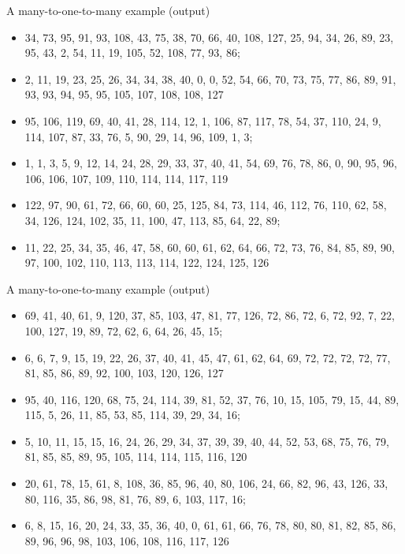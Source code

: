 \documentclass[10pt]{beamer}
\begin{document}
 \begin{frame}{A many-to-one-to-many example (output)}
 \begin{itemize}
   \item 34, 73, 95, 91, 93, 108, 43, 75, 38, 70, 66, 40, 108, 127, 25, 94, 34, 26, 89, 23, 95, 43, 2, 54, 11, 19, 105, 52, 108, 77, 93, 86;
   \item 2, 11, 19, 23, 25, 26, 34, 34, 38, 40, 0, 0, 52, 54, 66, 70, 73, 75, 77, 86, 89, 91, 93, 93, 94, 95, 95, 105, 107, 108, 108, 127
 \end{itemize}
 \begin{itemize}
   \item 95, 106, 119, 69, 40, 41, 28, 114, 12, 1, 106, 87, 117, 78, 54, 37, 110, 24, 9, 114, 107, 87, 33, 76, 5, 90, 29, 14, 96, 109, 1, 3;
   \item 1, 1, 3, 5, 9, 12, 14, 24, 28, 29, 33, 37, 40, 41, 54, 69, 76, 78, 86, 0, 90, 95, 96, 106, 106, 107, 109, 110, 114, 114, 117, 119
 \end{itemize}
 \begin{itemize}
   \item 122, 97, 90, 61, 72, 66, 60, 60, 25, 125, 84, 73, 114, 46, 112, 76, 110, 62, 58, 34, 126, 124, 102, 35, 11, 100, 47, 113, 85, 64, 22, 89;
   \item 11, 22, 25, 34, 35, 46, 47, 58, 60, 60, 61, 62, 64, 66, 72, 73, 76, 84, 85, 89, 90, 97, 100, 102, 110, 113, 113, 114, 122, 124, 125, 126
 \end{itemize}
 \end{frame}

 \begin{frame}{A many-to-one-to-many example (output)}
 \begin{itemize}
   \item 69, 41, 40, 61, 9, 120, 37, 85, 103, 47, 81, 77, 126, 72, 86, 72, 6, 72, 92, 7, 22, 100, 127, 19, 89, 72, 62, 6, 64, 26, 45, 15;
   \item 6, 6, 7, 9, 15, 19, 22, 26, 37, 40, 41, 45, 47, 61, 62, 64, 69, 72, 72, 72, 72, 77, 81, 85, 86, 89, 92, 100, 103, 120, 126, 127
 \end{itemize}
 \begin{itemize}
   \item 95, 40, 116, 120, 68, 75, 24, 114, 39, 81, 52, 37, 76, 10, 15, 105, 79, 15, 44, 89, 115, 5, 26, 11, 85, 53, 85, 114, 39, 29, 34, 16;
   \item 5, 10, 11, 15, 15, 16, 24, 26, 29, 34, 37, 39, 39, 40, 44, 52, 53, 68, 75, 76, 79, 81, 85, 85, 89, 95, 105, 114, 114, 115, 116, 120
 \end{itemize}
 \begin{itemize}
   \item 20, 61, 78, 15, 61, 8, 108, 36, 85, 96, 40, 80, 106, 24, 66, 82, 96, 43, 126, 33, 80, 116, 35, 86, 98, 81, 76, 89, 6, 103, 117, 16;
   \item 6, 8, 15, 16, 20, 24, 33, 35, 36, 40, 0, 61, 61, 66, 76, 78, 80, 80, 81, 82, 85, 86, 89, 96, 96, 98, 103, 106, 108, 116, 117, 126
 \end{itemize}
 \end{frame}
\end{document}

